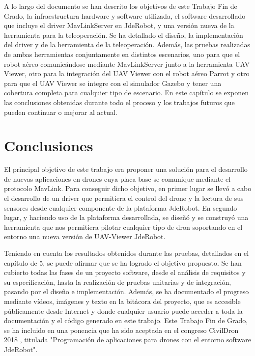 A lo largo del documento se han descrito los objetivos de este Trabajo Fin de Grado, la infraestructura hardware y software utilizada, el software desarrollado que incluye el driver MavLinkServer en JdeRobot, y una versión nueva de la herramienta para la teleoperación. Se ha detallado el diseño, la implementación del driver y de la herramienta de la teleoperación. Además, las pruebas realizadas de ambas herramientas conjuntamente en distintos escenarios, uno para que el robot aéreo comunicándose mediante MavLinkServer junto a la herramienta UAV Viewer, otro para la integración del UAV Viewer con el robot aéreo Parrot y otro para que el UAV Viewer se integre con el simulador Gazebo y tener una cobertura completa para cualquier tipo de escenario. En este capítulo se exponen las conclusiones obtenidas durante todo el proceso y los trabajos futuros que pueden continuar o mejorar al actual.

\section{Conclusiones}

El principal objetivo de este trabajo era proponer una solución para el desarrollo de nuevas aplicaciones en drones cuya placa base se comunique mediante el protocolo MavLink. Para conseguir dicho objetivo, en primer lugar se llevó a cabo el desarrollo de un driver que permitiera el control del drone y la lectura de sus sensores desde cualquier componente de la plataforma JdeRobot. En segundo lugar, y haciendo uso de la plataforma desarrollada, se diseñó y se construyó una herramienta que nos permitiera pilotar cualquier tipo de dron soportando en el entorno una nueva versión de UAV-Viewer JdeRobot.

Teniendo en cuenta los resultados obtenidos durante las pruebas, detallados en el capítulo de 5, se puede afirmar que se ha logrado el objetivo propuesto. Se han cubierto todas las fases de un proyecto software, desde el análisis de requisitos y su especificación, hasta la realización de pruebas unitarias y de integración, pasando por el diseño e implementación. Además, se ha documentado el progreso mediante vídeos, imágenes y texto en la bitácora del proyecto, que es accesible públicamente desde Internet y donde cualquier usuario puede acceder a toda la documentación y el código generado en este trabajo. Este Trabajo Fin de Grado, se ha incluido en una ponencia que ha sido aceptada en el congreso CivilDron 2018 \cite{civilDron}, titulada "Programación de aplicaciones para drones con el entorno software JdeRobot". 

